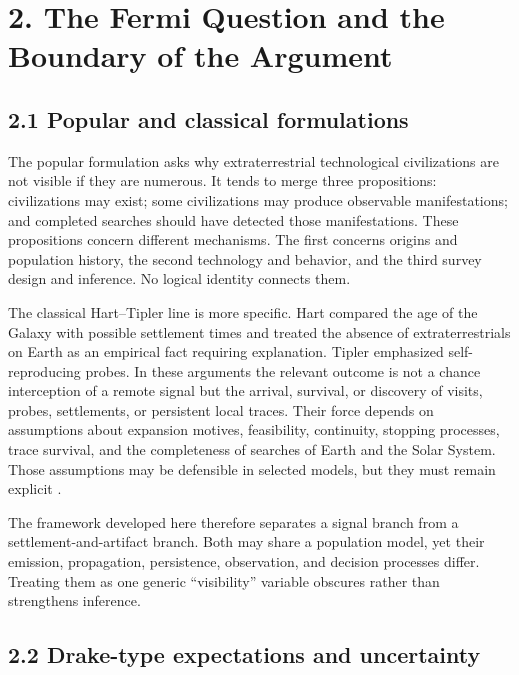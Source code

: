 \documentclass[11pt,a4paper]{article}
\begin{document}
\section{2. The Fermi Question and the Boundary of the Argument}\label{2-the-fermi-question-and-the-boundary-of-the-argument}

\subsection{2.1 Popular and classical formulations}\label{21-popular-and-classical-formulations}

The popular formulation asks why extraterrestrial technological civilizations are not visible if they are numerous. It tends to merge three propositions: civilizations may exist; some civilizations may produce observable manifestations; and completed searches should have detected those manifestations. These propositions concern different mechanisms. The first concerns origins and population history, the second technology and behavior, and the third survey design and inference. No logical identity connects them.

The classical Hart--Tipler line is more specific. Hart compared the age of the Galaxy with possible settlement times and treated the absence of extraterrestrials on Earth as an empirical fact requiring explanation. Tipler emphasized self-reproducing probes. In these arguments the relevant outcome is not a chance interception of a remote signal but the arrival, survival, or discovery of visits, probes, settlements, or persistent local traces. Their force depends on assumptions about expansion motives, feasibility, continuity, stopping processes, trace survival, and the completeness of searches of Earth and the Solar System. Those assumptions may be defensible in selected models, but they must remain explicit \citep{hart1975,tipler1980,newmansagan1981,olson2015,carrollnellenback2019,sandberg2018,hanson1998,hanson2021}.

The framework developed here therefore separates a signal branch from a settlement-and-artifact branch. Both may share a population model, yet their emission, propagation, persistence, observation, and decision processes differ. Treating them as one generic ``visibility'' variable obscures rather than strengthens inference.

\subsection{2.2 Drake-type expectations and uncertainty}\label{22-drake-type-expectations-and-uncertainty}
\end{document}
